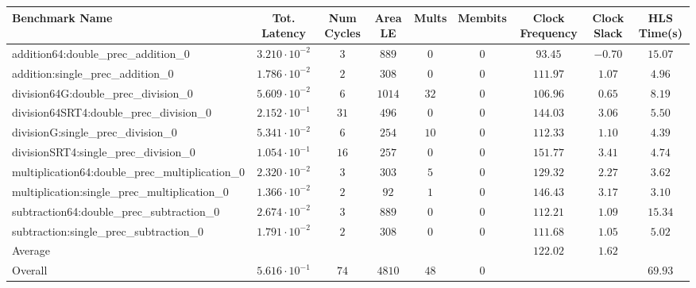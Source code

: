\begin{tabular}{|l|c|c|c|c|c|c|c|c|}
\hline
Benchmark Name                                   & Tot. Latency            & Num Cycles & Area LE  & Mults  & Membits & Clock Frequency & Clock Slack & HLS Time(s) \\
\hline
addition64:double\_prec\_addition\_0             & $ 3.210 \cdot 10^{-2} $ & $ 3      $ & $ 889  $ & $ 0  $ & $ 0   $ & $ 93.45       $ & $ -0.70   $ & $ 15.07   $ \\
addition:single\_prec\_addition\_0               & $ 1.786 \cdot 10^{-2} $ & $ 2      $ & $ 308  $ & $ 0  $ & $ 0   $ & $ 111.97      $ & $ 1.07    $ & $ 4.96    $ \\
division64G:double\_prec\_division\_0            & $ 5.609 \cdot 10^{-2} $ & $ 6      $ & $ 1014 $ & $ 32 $ & $ 0   $ & $ 106.96      $ & $ 0.65    $ & $ 8.19    $ \\
division64SRT4:double\_prec\_division\_0         & $ 2.152 \cdot 10^{-1} $ & $ 31     $ & $ 496  $ & $ 0  $ & $ 0   $ & $ 144.03      $ & $ 3.06    $ & $ 5.50    $ \\
divisionG:single\_prec\_division\_0              & $ 5.341 \cdot 10^{-2} $ & $ 6      $ & $ 254  $ & $ 10 $ & $ 0   $ & $ 112.33      $ & $ 1.10    $ & $ 4.39    $ \\
divisionSRT4:single\_prec\_division\_0           & $ 1.054 \cdot 10^{-1} $ & $ 16     $ & $ 257  $ & $ 0  $ & $ 0   $ & $ 151.77      $ & $ 3.41    $ & $ 4.74    $ \\
multiplication64:double\_prec\_multiplication\_0 & $ 2.320 \cdot 10^{-2} $ & $ 3      $ & $ 303  $ & $ 5  $ & $ 0   $ & $ 129.32      $ & $ 2.27    $ & $ 3.62    $ \\
multiplication:single\_prec\_multiplication\_0   & $ 1.366 \cdot 10^{-2} $ & $ 2      $ & $ 92   $ & $ 1  $ & $ 0   $ & $ 146.43      $ & $ 3.17    $ & $ 3.10    $ \\
subtraction64:double\_prec\_subtraction\_0       & $ 2.674 \cdot 10^{-2} $ & $ 3      $ & $ 889  $ & $ 0  $ & $ 0   $ & $ 112.21      $ & $ 1.09    $ & $ 15.34   $ \\
subtraction:single\_prec\_subtraction\_0         & $ 1.791 \cdot 10^{-2} $ & $ 2      $ & $ 308  $ & $ 0  $ & $ 0   $ & $ 111.68      $ & $ 1.05    $ & $ 5.02    $ \\
\hline
Average                                          & $                     $ & $        $ & $      $ & $    $ & $     $ & $ 122.02      $ & $ 1.62    $ & $         $ \\
\hline
Overall                                          & $ 5.616 \cdot 10^{-1} $ & $ 74     $ & $ 4810 $ & $ 48 $ & $ 0   $ & $             $ & $         $ & $ 69.93   $ \\
\hline
\end{tabular}
